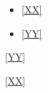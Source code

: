 \documentclass{article}
\begin{document}
\label{XX}

\begin{itemize}
\item{\ref{XX}}
\item{\ref{YY}}
\end{itemize}

\ref{YY}

\ref{XX}


\end{document}

